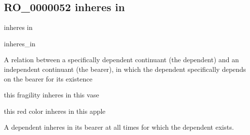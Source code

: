 \documentclass[letterpaper,10pt,english]{sphinxmanual}
\begin{document}
\subsection{RO\_0000052 \sphinxhyphen{} inheres in}
\label{\detokenize{doc-RO_0000052:ro-0000052-inheres-in}}\label{\detokenize{doc-RO_0000052:index-0}}\label{\detokenize{doc-RO_0000052::doc}}
\begin{sphinxShadowBox}

\sphinxAtStartPar
inheres in
\end{sphinxShadowBox}

\begin{sphinxShadowBox}

\sphinxAtStartPar
inheres\_in
\end{sphinxShadowBox}

\begin{sphinxShadowBox}

\sphinxAtStartPar
{}
\end{sphinxShadowBox}

\begin{sphinxShadowBox}

\sphinxAtStartPar
A relation between a specifically dependent continuant (the dependent) and an independent continuant (the bearer), in which the dependent specifically depends on the bearer for its existence
\end{sphinxShadowBox}

\begin{sphinxShadowBox}

\sphinxAtStartPar
this fragility inheres in this vase

\sphinxAtStartPar
this red color inheres in this apple
\end{sphinxShadowBox}

\begin{sphinxShadowBox}

\sphinxAtStartPar
A dependent inheres in its bearer at all times for which the dependent exists.
\end{sphinxShadowBox}

\begin{sphinxShadowBox}

\sphinxAtStartPar
{}
\end{sphinxShadowBox}
\begin{quote}

\ignorespaces \end{quote}
\end{document}

